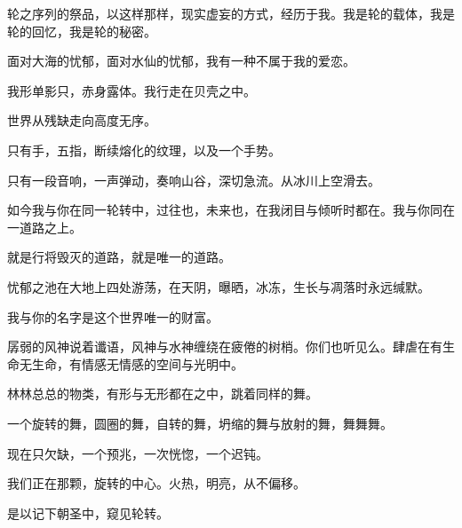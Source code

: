 \documentclass[UTF8]{article}
\begin{document}
\par 轮之序列的祭品，以这样那样，现实虚妄的方式，经历于我。我是轮的载体，我是轮的回忆，我是轮的秘密。
\\[0.6cm]
\par 面对大海的忧郁，面对水仙的忧郁，我有一种不属于我的爱恋。
\par 我形单影只，赤身露体。我行走在贝壳之中。
\par 世界从残缺走向高度无序。
\par 只有手，五指，断续熔化的纹理，以及一个手势。
\par 只有一段音响，一声弹动，奏响山谷，深切急流。从冰川上空滑去。
\par 如今我与你在同一轮转中，过往也，未来也，在我闭目与倾听时都在。我与你同在一道路之上。
\par 就是行将毁灭的道路，就是唯一的道路。
\par 忧郁之池在大地上四处游荡，在天阴，曝晒，冰冻，生长与凋落时永远缄默。
\par 我与你的名字是这个世界唯一的财富。
\par 孱弱的风神说着谶语，风神与水神缠绕在疲倦的树梢。你们也听见么。肆虐在有生命无生命，有情感无情感的空间与光明中。
\par 林林总总的物类，有形与无形都在之中，跳着同样的舞。
\par 一个旋转的舞，圆圈的舞，自转的舞，坍缩的舞与放射的舞，舞舞舞。
\par 现在只欠缺，一个预兆，一次恍惚，一个迟钝。
\par 我们正在那颗，旋转的中心。火热，明亮，从不偏移。
\par 是以记下朝圣中，窥见轮转。
\end{document}
